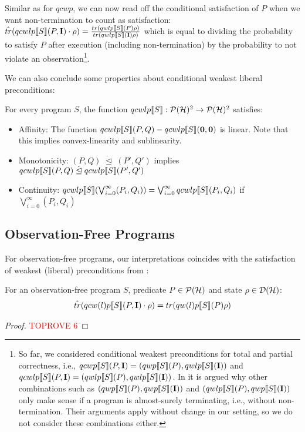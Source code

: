 \documentclass[a4paper,UKenglish,cleveref, autoref, thm-restate]{lipics-v2021}
\begin{document}
Similar as for $qcwp$, we can now read off the conditional satisfaction of $P$ when we want non-termination to count as satisfaction:
$\hat{tr}(qcwlp\llbracket S \rrbracket (P,\textbf{I})\cdot \rho) = \frac{tr(qwlp\llbracket S \rrbracket (P) \rho)}{tr(qwlp\llbracket S \rrbracket (\textbf{I})\rho)}$ which is equal to dividing the probability to satisfy $P$ after execution (including non-termination) by the probability to not violate an observation\footnote[1]{So far, we considered conditional weakest preconditions for total and partial correctness, i.e., $qcwp\llbracket S \rrbracket (P,\textbf{I}) = (qwp\llbracket S \rrbracket (P), qwlp\llbracket S \rrbracket (\textbf{I}))$ and $qcwlp\llbracket S \rrbracket (P,\textbf{I}) = (qwlp\llbracket S \rrbracket (P), qwlp\llbracket S \rrbracket (\textbf{I}))$.
In \cite[Sect. 8.3]{benniDiss} it is argued why other combinations such as $(qwp\llbracket S \rrbracket (P),qwp\llbracket S \rrbracket (\textbf{I}))$ and $(qwlp\llbracket S \rrbracket (P),qwp\llbracket S \rrbracket (\textbf{I}))$ only make sense if a program is almost-surely terminating, i.e., without non-termination. Their arguments apply without change in our setting, so we do not consider these combinations either.}.

We can also conclude some properties about conditional weakest liberal preconditions:
\begin{proposition} \label{prop:healthcwlp}
    For every program $S$, the function $qcwlp\llbracket S \rrbracket:\mathcal{P}(\mathcal{H})^2 \to \mathcal{P}(\mathcal{H})^2$ satisfies:
    \begin{itemize}
        \item Affinity: The function $qcwlp\llbracket S \rrbracket (P,Q) - qcwlp\llbracket S \rrbracket (\mathbf{0},\mathbf{0})$ is linear. Note that this implies convex-linearity and sublinearity.
        \item Monotonicity: $(P,Q) \phantom{.}\dot \unlhd \phantom{.} (P',Q')$ implies $qcwlp\llbracket S \rrbracket (P,Q)\phantom{.}\dot \unlhd \phantom{.}qcwlp\llbracket S \rrbracket (P',Q')$
        \item Continuity: $qcwlp\llbracket S \rrbracket (\bigvee_{i=0}^\infty (P_i,Q_i)) = \bigvee_{i=0}^\infty qcwlp\llbracket S \rrbracket (P_i,Q_i)$ if $\bigvee_{i=0}^\infty (P_i,Q_i)$
    \end{itemize}
\end{proposition}

\subsection{Observation-Free Programs}
For observation-free programs, our interpretations coincides with the satisfaction of weakest (liberal) preconditions from \cite{floydHoareLogic}:
\begin{lemma}
    For an observation-free program $S$, predicate $P\in \mathcal{P}(\mathcal{H})$ and state $\rho \in \mathcal{D}(\mathcal{H})$:
    \begin{align*}
        \hat{tr}(qcw(l)p\llbracket S \rrbracket (P,\textbf{I}) \cdot \rho)= tr(qw(l)p\llbracket S \rrbracket (P)\rho)
\end{align*}
\end{lemma}
\begin{proof}\textcolor{red}{TOPROVE 6}\end{proof}
\end{document}
